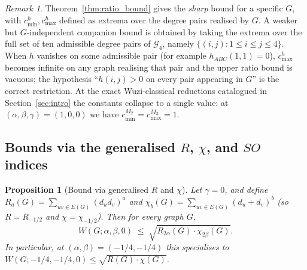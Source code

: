 \documentclass[a5paper, 10pt]{article}
\theoremstyle{plain}
\newtheorem{proposition}[theorem]{Proposition}
\theoremstyle{remark}
\newtheorem*{remark}{Remark}
\theoremstyle{definition}
\begin{document}
\begin{remark}
Theorem~\ref{thm:ratio_bound} gives the \emph{sharp} bound for a
specific $G$, with $c_{\min}^h, c_{\max}^h$ defined as extrema
over the degree pairs realised by $G$. A weaker but
$G$-independent companion bound is obtained by taking the
extrema over the full set of ten admissible degree pairs of
$\mathcal{G}_4$, namely $\{(i, j) : 1 \le i \le j \le 4\}$. When
$h$ vanishes on some admissible pair (for example
$h_{ABC}(1, 1) = 0$), $c_{\max}^{h}$ becomes infinite on any
graph realising that pair and the upper ratio bound is vacuous;
the hypothesis ``$h(i, j) > 0$ on every pair appearing in $G$''
is the correct restriction. At the exact Wuzi-classical
reductions catalogued in Section~\ref{sec:intro} the constants
collapse to a single value: at
$(\alpha, \beta, \gamma) = (1, 0, 0)$ we have
$c_{\min}^{M_2} = c_{\max}^{M_2} = 1$.
\end{remark}

\subsection{Bounds via the generalised \texorpdfstring{$R$, $\chi$, and $SO$}{R, chi, and SO} indices}\label{sub:R_chi_SO}

\begin{proposition}[Bound via generalised $R$ and $\chi$]\label{thm:R_chi}
Let $\gamma = 0$, and define
$R_a(G) = \sum_{uv \in E(G)} (d_u d_v)^{a}$ and
$\chi_b(G) = \sum_{uv \in E(G)} (d_u + d_v)^{b}$ (so $R = R_{-1/2}$
and $\chi = \chi_{-1/2}$). Then for every graph $G$,
\begin{equation}\label{eq:R_chi_bound}
W(G; \alpha, \beta, 0)
\;\le\; \sqrt{R_{2\alpha}(G) \cdot \chi_{2\beta}(G)}.
\end{equation}
In particular, at $(\alpha, \beta) = (-1/4, -1/4)$ this
specialises to $W(G; -1/4, -1/4, 0) \le \sqrt{R(G) \cdot \chi(G)}$.
\end{proposition}
\end{document}
